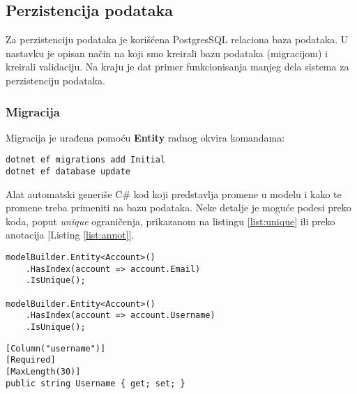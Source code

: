 \subsection{Perzistencija podataka}
\par Za perzistenciju podataka je korišćena PostgresSQL relaciona baza podataka. U nastavku je opisan način na koji smo kreirali bazu podataka (migracijom)
i kreirali validaciju. Na kraju je dat primer funkcionisanja manjeg dela sistema za perzistenciju podataka.
\subsubsection*{Migracija}
\par Migracija je urađena pomoću \textbf{Entity} radnog okvira komandama:
\begin{lstlisting}[caption={Kreiranje migracije}, captionpos=b]
dotnet ef migrations add Initial
dotnet ef database update
\end{lstlisting}
\par Alat automatski generiše C\# kod koji predstavlja promene u modelu i kako te promene treba primeniti na bazu podataka. Neke detalje je moguće podesi preko 
koda, poput \textit{unique} ograničenja, prikazanom na listingu \ref{list:unique} ili preko anotacija [Listing \ref{list:annot}]. 
\begin{lstlisting}[caption={Primer postavljanja unique ograničenja}, label=list:unique, captionpos=b]
modelBuilder.Entity<Account>()
    .HasIndex(account => account.Email)
    .IsUnique();

modelBuilder.Entity<Account>()
    .HasIndex(account => account.Username)
    .IsUnique();
\end{lstlisting}
\begin{lstlisting}[caption={Primer postavljanja anotacija}, label=list:annot, captionpos=b]
[Column("username")]
[Required]
[MaxLength(30)]
public string Username { get; set; }
\end{lstlisting}
